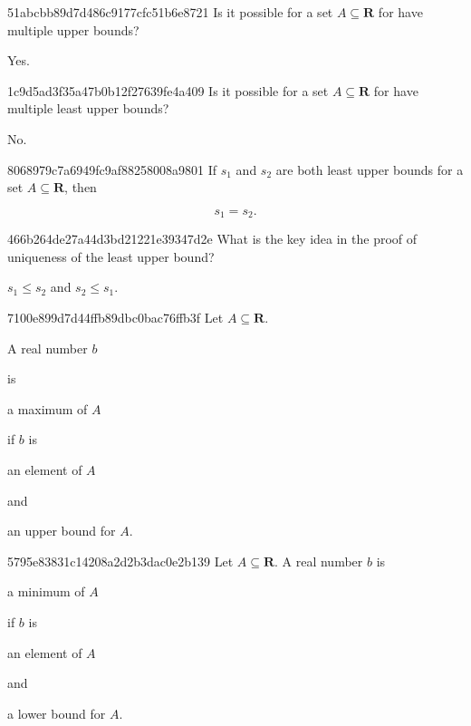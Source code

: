 \begin{note}{51abcbb89d7d486c9177cfc51b6e8721}
    Is it possible for a set \({ A \subseteq \mathbf{R} }\) for have multiple upper bounds?

    \begin{cloze}{1}
        Yes.
    \end{cloze}
\end{note}

\begin{note}{1c9d5ad3f35a47b0b12f27639fe4a409}
    Is it possible for a set \({ A \subseteq \mathbf{R} }\) for have multiple least upper bounds?

    \begin{cloze}{1}
        No.
    \end{cloze}
\end{note}

\begin{note}{8068979c7a6949fc9af88258008a9801}
    If \({ s_1 }\) and \({ s_2 }\) are both least upper bounds for a set \({ A \subseteq \mathbf{R} }\), then
    \begin{icloze}{1}
        \[
            s_1 = s_2.
        \]
    \end{icloze}
\end{note}

\begin{note}{466b264de27a44d3bd21221e39347d2e}
    What is the key idea in the proof of uniqueness of the least upper bound?

    \begin{cloze}{1}
        \({ s_1 \leq s_2 }\) and \({ s_2 \leq s_1 }\).
    \end{cloze}
\end{note}

\begin{note}{7100e899d7d44ffb89dbc0bac76ffb3f}
    Let \({ A \subseteq \mathbf{R} }\). \begin{icloze}{4}A real number \({ b }\)\end{icloze} is \begin{icloze}{3}a maximum of \({ A }\)\end{icloze} if \({ b }\) is \begin{icloze}{2}an element of \({ A }\)\end{icloze} and \begin{icloze}{1}an upper bound for \({ A }\).\end{icloze}
\end{note}

\begin{note}{5795e83831c14208a2d2b3dac0e2b139}
    Let \({ A \subseteq \mathbf{R} }\). A real number \({ b }\) is \begin{icloze}{3}a minimum of \({ A }\)\end{icloze} if \({ b }\) is \begin{icloze}{2}an element of \({ A }\)\end{icloze} and \begin{icloze}{1}a lower bound for \({ A }\).\end{icloze}
\end{note}

